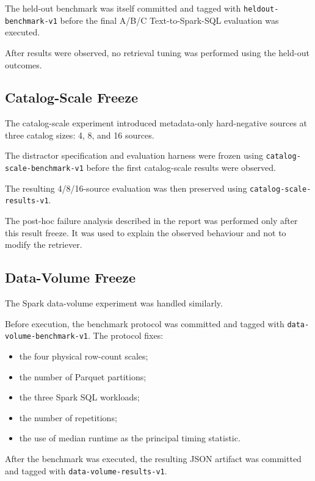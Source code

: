 The held-out benchmark was itself committed and tagged with
\texttt{heldout-benchmark-v1} before the final A/B/C Text-to-Spark-SQL
evaluation was executed.

After results were observed, no retrieval tuning was performed using the
held-out outcomes.


\subsection{Catalog-Scale Freeze}

The catalog-scale experiment introduced metadata-only hard-negative sources
at three catalog sizes: 4, 8, and 16 sources.

The distractor specification and evaluation harness were frozen using
\texttt{catalog-scale-benchmark-v1} before the first catalog-scale results
were observed.

The resulting 4/8/16-source evaluation was then preserved using
\texttt{catalog-scale-results-v1}.

The post-hoc failure analysis described in the report was performed only after
this result freeze. It was used to explain the observed behaviour and not to
modify the retriever.


\subsection{Data-Volume Freeze}

The Spark data-volume experiment was handled similarly.

Before execution, the benchmark protocol was committed and tagged with
\texttt{data-volume-benchmark-v1}. The protocol fixes:

\begin{itemize}

    \item the four physical row-count scales;
    \item the number of Parquet partitions;
    \item the three Spark SQL workloads;
    \item the number of repetitions;
    \item the use of median runtime as the principal timing statistic.

\end{itemize}

After the benchmark was executed, the resulting JSON artifact was committed
and tagged with \texttt{data-volume-results-v1}.


